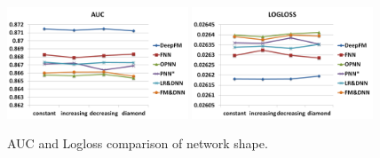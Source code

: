 \begin{figure}[ht]
\setlength{\abovecaptionskip}{0pt}%
\setlength{\belowcaptionskip}{-10pt}
\centering
\begin{minipage}[b]{0.5\textwidth}
\includegraphics[width=0.48\textwidth]{img/shape-auc.png}
\includegraphics[width=0.48\textwidth]{img/shape-logloss.png}
\end{minipage}
\caption{\footnotesize{AUC and Logloss comparison of network shape.}}\label{fig:shape}
\end{figure}

